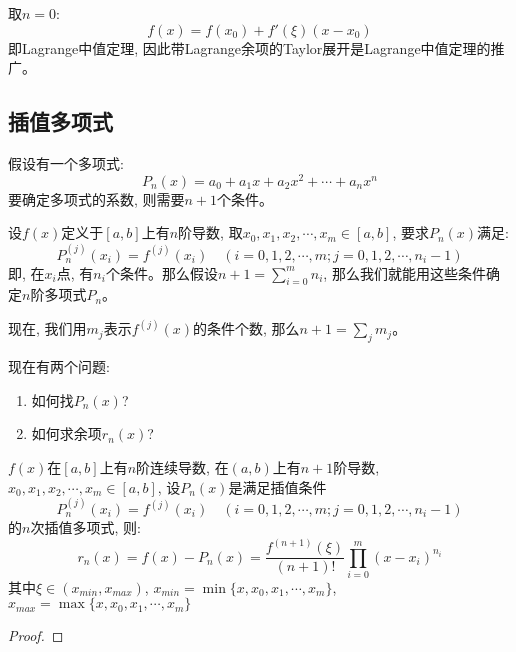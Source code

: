 \begin{remark}
    取$n = 0$:
    \begin{equation*}
        f(x) = f(x_0) + f'(\xi)(x - x_0)
    \end{equation*}
    即Lagrange中值定理, 因此带Lagrange余项的Taylor展开是Lagrange中值定理的推广。
\end{remark}

\subsection{插值多项式}
假设有一个多项式:
\begin{equation*}
    P_n(x) = a_0 + a_1x + a_2x^2 + \cdots + a_nx^n
\end{equation*}
要确定多项式的系数, 则需要$n+1$个条件。

设$f(x)$定义于$[a, b]$上有$n$阶导数, 取$x_0, x_1, x_2, \cdots, x_m \in [a, b]$, 要求$P_n(x)$满足:
\begin{equation*}
    P_n^{(j)}(x_i) = f^{(j)}(x_i) \quad (i = 0, 1, 2, \cdots, m; j = 0, 1, 2, \cdots, n_i-1)
\end{equation*}
即, 在$x_i$点, 有$n_i$个条件。那么假设$n+1 = \sum_{i = 0}^m n_i$, 那么我们就能用这些条件确定$n$阶多项式$P_n$。

现在, 我们用$m_j$表示$f^{(j)}(x)$的条件个数, 那么$n+1 = \sum_{j} m_j$。


现在有两个问题:
\begin{enumerate}
    \item 如何找$P_n(x)$?
    \item 如何求余项$r_n(x)$?
\end{enumerate}

\begin{theorem}[插值多项式的余项定理]
    $f(x)$在$[a, b]$上有$n$阶连续导数, 在$(a, b)$上有$n+1$阶导数, $x_0, x_1, x_2, \cdots, x_m \in [a, b]$, 设$P_n(x)$是满足插值条件
    \begin{equation*}
        P_n^{(j)}(x_i) = f^{(j)}(x_i) \quad (i = 0, 1, 2, \cdots, m; j = 0, 1, 2, \cdots, n_i-1)
    \end{equation*}
    的$n$次插值多项式, 则:
    \begin{equation*}
        r_n(x) =f(x) - P_n(x) = \frac{f^{(n+1)}(\xi)}{(n+1)!}\prod_{i=0}^{m}(x-x_i)^{n_i}
    \end{equation*}
    其中$\xi \in (x_{min}, x_{max})$, $x_{min} = \min\{x, x_0, x_1, \cdots, x_m\}$, $x_{max} = \max\{x, x_0, x_1, \cdots, x_m\}$
\end{theorem}
\begin{proof}
    
\end{proof}

